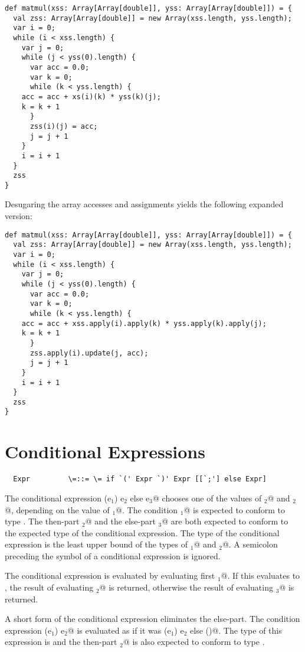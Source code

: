 \documentclass[11pt]{report}
\begin{document}
\begin{verbatim}
def matmul(xss: Array[Array[double]], yss: Array[Array[double]]) = {
  val zss: Array[Array[double]] = new Array(xss.length, yss.length);
  var i = 0;
  while (i < xss.length) {
    var j = 0;
    while (j < yss(0).length) {
      var acc = 0.0;
      var k = 0;
      while (k < yss.length) {
	acc = acc + xs(i)(k) * yss(k)(j);
	k = k + 1
      }
      zss(i)(j) = acc;
      j = j + 1
    }
    i = i + 1
  }
  zss
}
\end{verbatim}
Desugaring the array accesses and assignments yields the following
expanded version:
\begin{verbatim}
def matmul(xss: Array[Array[double]], yss: Array[Array[double]]) = {
  val zss: Array[Array[double]] = new Array(xss.length, yss.length);
  var i = 0;
  while (i < xss.length) {
    var j = 0;
    while (j < yss(0).length) {
      var acc = 0.0;
      var k = 0;
      while (k < yss.length) {
	acc = acc + xss.apply(i).apply(k) * yss.apply(k).apply(j);
	k = k + 1
      }
      zss.apply(i).update(j, acc);
      j = j + 1
    }
    i = i + 1
  }
  zss
}
\end{verbatim}

\section{Conditional Expressions}

\syntax\begin{verbatim}
  Expr	       \=::= \= if `(' Expr `)' Expr [[`;'] else Expr]
\end{verbatim}

The conditional expression \verb@if (e$_1$) e$_2$ else e$_3$@ chooses
one of the values of \verb@e$_2$@ and \verb@e$_2$@, depending on the
value of \verb@e$_1$@. The condition \verb@e$_1$@ is expected to
conform to type \verb@boolean@.  The then-part \verb@e$_2$@ and the
else-part \verb@e$_3$@ are both expected to conform to the expected
type of the conditional expression. The type of the conditional
expression is the least upper bound of the types of \verb@e$_1$@ and
\verb@e$_2$@.  A semicolon preceding the \verb@else@ symbol of a
conditional expression is ignored.

The conditional expression is evaluated by evaluating first
\verb@e$_1$@. If this evaluates to \verb@true@, the result of
evaluating \verb@e$_2$@ is returned, otherwise the result of
evaluating \verb@e$_3$@ is returned.

A short form of the conditional expression eliminates the
else-part. The condition expression \verb@if (e$_1$) e$_2$@ is
evaluated as if it was \verb@if (e$_1$) e$_2$ else ()@.  The type of
this expression is \verb@unit@ and the then-part
\verb@e$_2$@ is also expected to conform to type \verb@unit@.
\end{document}
